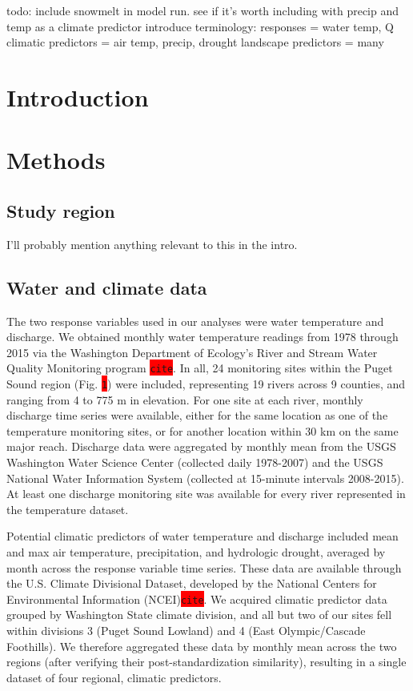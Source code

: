 \documentclass{article}
\begin{document}
todo:
include snowmelt in model run. see if it's worth including with precip and temp as a climate predictor
introduce terminology:
responses = water temp, Q
climatic predictors = air temp, precip, drought
landscape predictors = many

\section*{Introduction}

\section*{Methods}

\subsection*{Study region}

I'll probably mention anything relevant to this in the intro.

\subsection*{Water and climate data}

The two response variables used in our analyses were water temperature and discharge. We obtained monthly water temperature readings from 1978 through 2015 via the Washington Department of Ecology's River and Stream Water Quality Monitoring program \colorbox{red}{\lstinline{cite}}. In all, 24 monitoring sites within the Puget Sound region (Fig. \colorbox{red}{\lstinline{1}}) were included, representing 19 rivers across 9 counties, and ranging from 4 to 775 m in elevation. For one site at each river, monthly discharge time series were available, either for the same location as one of the temperature monitoring sites, or for another location within 30 km on the same major reach. Discharge data were aggregated by monthly mean from the USGS Washington Water Science Center (collected daily 1978-2007) and the USGS National Water Information System (collected at 15-minute intervals 2008-2015). At least one discharge monitoring site was available for every river represented in the temperature dataset.

Potential climatic predictors of water temperature and discharge included mean and max air temperature, precipitation, and hydrologic drought, averaged by month across the response variable time series. These data are available through the U.S. Climate Divisional Dataset, developed by the National Centers for Environmental Information (NCEI)\colorbox{red}{\lstinline{cite}}. We acquired climatic predictor data grouped by Washington State climate division, and all but two of our sites fell within divisions 3 (Puget Sound Lowland) and 4 (East Olympic/Cascade Foothills). We therefore aggregated these data by monthly mean across the two regions (after verifying their post-standardization similarity), resulting in a single dataset of four regional, climatic predictors.
\end{document}
